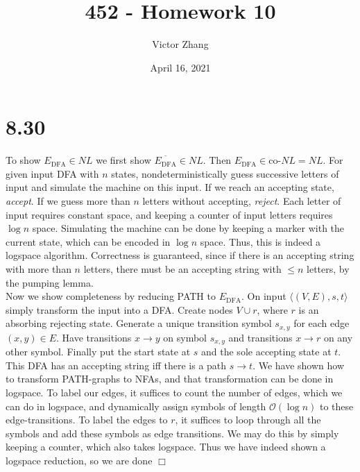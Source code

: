 \documentclass{article}
\title{452 - Homework 10}
\author{Victor Zhang}
\date{April 16, 2021}
\begin{document}
\maketitle

\section*{8.30}
To show $E_{\mathrm{DFA}} \in NL$ we first show $\overline{E_{\mathrm{DFA}}} \in NL$. Then $E_{\mathrm{DFA}} \in \text{co-}NL = NL$. For given input DFA with $n$ states, nondeterministically guess successive letters of input and simulate the machine on this input. If we reach an accepting state, \textit{accept}. If we guess more than $n$ letters without accepting, \textit{reject}. Each letter of input requires constant space, and keeping a counter of input letters requires $\log n$ space. Simulating the machine can be done by keeping a marker with the current state, which can be encoded in $\log n$ space. Thus, this is indeed a logspace algorithm. Correctness is guaranteed, since if there is an accepting string with more than $n$ letters, there must be an accepting string with $\leqslant n$ letters, by the pumping lemma.\\
Now we show completeness by reducing PATH to $E_{\mathrm{DFA}}$. On input $\langle (V,E),s,t \rangle$ simply transform the input into a DFA. Create nodes $V \cup {r}$, where $r$ is an absorbing rejecting state. Generate a unique transition symbol $s_{x,y}$ for each edge $(x,y) \in E$. Have transitions $x \to y$ on symbol $s_{x,y}$ and transitions $x \to r$ on any other symbol. Finally put the start state at $s$ and the sole accepting state at $t$. This DFA has an accepting string iff there is a path $s \to t$. We have shown how to transform PATH-graphs to NFAs, and that transformation can be done in logspace. To label our edges, it suffices to count the number of edges, which we can do in logspace, and dynamically assign symbols of length $\mathcal{O}(\log n)$ to these edge-transitions. To label the edges to $r$, it suffices to loop through all the symbols and add these symbols as edge transitions. We may do this by simply keeping a counter, which also takes logspace. Thus we have indeed shown a logspace reduction, so we are done $\Box$
\end{document}
